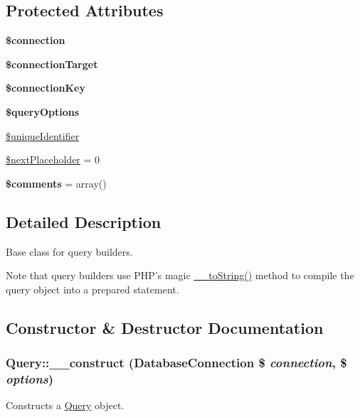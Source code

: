 \subsection*{Protected Attributes}
\begin{DoxyCompactItemize}
\item 
\hypertarget{classQuery_ad2260119848060bb535ca58390b10668}{
{\bfseries \$connection}}
\label{classQuery_ad2260119848060bb535ca58390b10668}

\item 
\hypertarget{classQuery_a402ec2b0a8f6e68e7c9fb0d012c5ef90}{
{\bfseries \$connectionTarget}}
\label{classQuery_a402ec2b0a8f6e68e7c9fb0d012c5ef90}

\item 
\hypertarget{classQuery_ad227c594a2d25a3f95e440fc3d33552d}{
{\bfseries \$connectionKey}}
\label{classQuery_ad227c594a2d25a3f95e440fc3d33552d}

\item 
\hypertarget{classQuery_ad889775600e408d503d79b55d4599ad5}{
{\bfseries \$queryOptions}}
\label{classQuery_ad889775600e408d503d79b55d4599ad5}

\item 
\hyperlink{classQuery_a964c5e7a55b10b57bd10a5667abd2a3c}{\$uniqueIdentifier}
\item 
\hyperlink{classQuery_a971abbb28ad6cffc0b3260a1ca6e867a}{\$nextPlaceholder} = 0
\item 
\hypertarget{classQuery_ab545c0037b0e730712d965cd95f51d2e}{
{\bfseries \$comments} = array()}
\label{classQuery_ab545c0037b0e730712d965cd95f51d2e}

\end{DoxyCompactItemize}


\subsection{Detailed Description}
Base class for query builders.

Note that query builders use PHP's magic \hyperlink{classQuery_a16c3a3265666b784d49ce18a6fda9a8a}{\_\-\_\-toString()} method to compile the query object into a prepared statement. 

\subsection{Constructor \& Destructor Documentation}
\hypertarget{classQuery_a3fae0cd122cc9f885ec035b5e47c0e5b}{
\subsubsection[{\_\-\_\-construct}]{\setlength{\rightskip}{0pt plus 5cm}Query::\_\-\_\-construct ({\bf DatabaseConnection} \$ {\em connection}, \/  \$ {\em options})}}
\label{classQuery_a3fae0cd122cc9f885ec035b5e47c0e5b}
Constructs a \hyperlink{classQuery}{Query} object.


